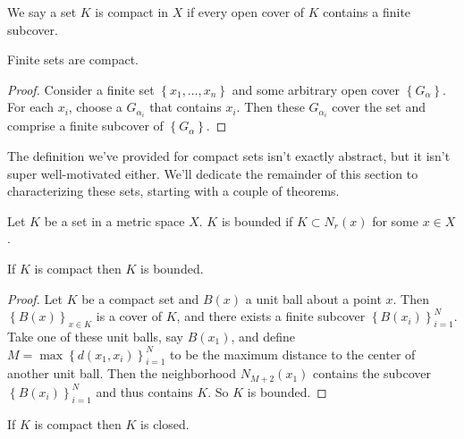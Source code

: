 \documentclass[../m131main.tex]{subfiles}
\begin{document}
\begin{definition}
    We say a set $K$ is compact in $X$ if every open cover of $K$ contains a finite subcover.
\end{definition}

\begin{theorem}[]
    Finite sets are compact.
\end{theorem}

\begin{proof}
    Consider a finite set $\left\{ x_1, \ldots, x_n \right\}$ and some arbitrary open cover $\left\{ G_\alpha \right\}$.
    For each $x_i$, choose a $G_{\alpha_i}$ that contains $x_i$.
    Then these $G_{\alpha_i}$ cover the set and comprise a finite subcover of $\left\{ G_\alpha \right\}$.
\end{proof}

The definition we've provided for compact sets isn't exactly abstract, but it isn't super well-motivated either.
We'll dedicate the remainder of this section to characterizing these sets, starting with a couple of theorems.

\begin{definition}
    Let $K$ be a set in a metric space $X$.
    $K$ is bounded if $K \subset N_r(x)$ for some $x \in X$.
\end{definition}

\begin{theorem}
    If $K$ is compact then $K$ is bounded.
\end{theorem}

\begin{proof}
    Let $K$ be a compact set and $B(x)$ a unit ball about a point $x$.
    Then $\left\{ B(x) \right\}_{x \in K}$ is a cover of $K$, and there exists a finite subcover $\left\{ B(x_i) \right\}_{i=1}^N$.
    Take one of these unit balls, say $B(x_1)$, and define $M = \max \left\{ d(x_1, x_i) \right\}_{i=1}^N$ to be the maximum distance to the center of another unit ball.
    Then the neighborhood $N_{M+2}(x_1)$ contains the subcover $\left\{ B(x_i) \right\}_{i=1}^N$ and thus contains $K$.
    So $K$ is bounded.
\end{proof}

\begin{theorem}
    If $K$ is compact then $K$ is closed.
\end{theorem}
\end{document}
